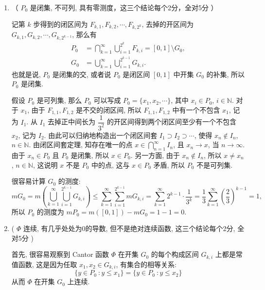 \begin{solution}
  \begin{enumerate}
    \item （ \(P_0\) 是闭集, 不可列, 具有零测度，这三个结论每个2分，全对5分 ）

    记第 \(k\) 步得到的闭区间为 \(F_{k, 1}, F_{k, 2}, \cdots, F_{k, 2^k}\), 去掉的开区间为 \(G_{k, 1}, G_{k, 2}, \cdots, G_{k, 2^{k-1}}\), 那么有
    \[\begin{aligned}
    P_0 & = \bigcap\limits_{k=1}^{\infty} \bigcup\limits_{i=1}^{2^k} F_{k, i} = [0, 1] \setminus G_0, \\
    G_0 & = \bigcup\limits_{k=1}^{\infty} \bigcup\limits_{i=1}^{2^{k-1}} G_{k, i}.
    \end{aligned}\]
    也就是说, \(P_0\) 是闭集的交, 或者说 \(P_0\) 是闭区间 \([0, 1]\) 中开集 \(G_0\) 的补集, 所以 \(P_0\) 是闭集.

    假设 \(P_0\) 是可列集, 那么 \(P_0\) 可以写成 \(P_0 = \{ x_1, x_2, \cdots \}\), 其中 \(x_i \in P_0\), \(i \in \mathbb{N}\). 对于 \(x_1\), 由于 \(F_{1, 1}, F_{1, 2}\) 是不交的闭区间, 所以 \(F_{1, 1}, F_{1, 2}\) 中有一个不包含 \(x_1\), 记为 \(I_1\). 从 \(I_1\) 去掉正中间长为 \(\dfrac{1}{3^2}\) 的开区间得到两个闭区间至少有一个不包含 \(x_2\), 记为 \(I_2\). 由此可以归纳地构造出一个闭区间套 \(I_1 \supset I_2 \supset \cdots\), 使得 \(x_n \notin I_n\), \(n \in \mathbb{N}\). 由闭区间套定理, 知存在唯一的点 \(x \in \bigcap\limits_{n=1}^{\infty} I_n\), 且 \(x_n \to x\), 当 \(n \to \infty\). 由于 \(x_n \in P_0\) 且 \(P_0\) 是闭集, 所以 \(x \in P_0\). 另一方面, 由于 \(x_n \notin I_n\), 所以 \(x \neq x_n\), \(n \in \mathbb{N}\), 这说明 \(x\) 不是 \(P_0\) 中的点, 这与 \(x \in P_0\) 矛盾, 所以 \(P_0\) 不是可列集.

    很容易计算 \(G_0\) 的测度:
    \[m G_0 = m \left( \bigcup\limits_{k=1}^{\infty} \bigcup\limits_{i=1}^{2^{k-1}} G_{k, i} \right) \leqslant \sum\limits_{k=1}^{\infty} \sum\limits_{i=1}^{2^{k-1}} m G_{k, i} = \sum\limits_{k=1}^{\infty} 2^{k-1} \cdot \dfrac{1}{3^k} = \dfrac{1}{3} \sum\limits_{k=1}^{\infty} \left( \dfrac{2}{3} \right)^{k-1} = 1,\]
    所以 \(P_0\) 的测度为 \(m P_0 = m ([0, 1]) - m G_0 = 1 - 1 = 0\).
    \item ( \(\Phi\) 连续, 有几乎处处为0的导数, 但不是绝对连续函数, 这三个结论每个2分, 全对5分 )  

    首先, 很容易观察到 Cantor 函数 \(\Phi\) 在开集 \(G_0\) 的每个构成区间 \(G_{k, i}\) 上都是常值函数, 这是因为任取 \(x_1, x_2 \in G_{k, i}\), 有集合的相等关系:
    \[\{y \in P_0 ~ \colon y \leqslant x_1\} = \{y \in P_0 ~ \colon y \leqslant x_2\}\]
    从而 \(\Phi\) 在开集 \(G_0\) 上连续.


\end{enumerate}
\end{solution}
